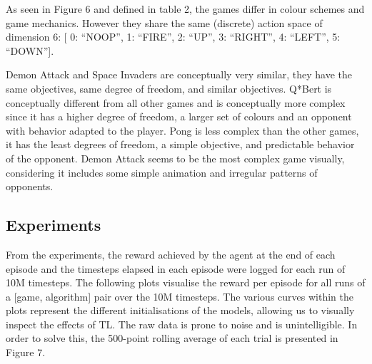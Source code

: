 As seen in Figure 6 and defined in table 2, the games differ in colour schemes and game mechanics. However they share the same (discrete) action space of dimension 6: [ 0: ``NOOP'', 1: ``FIRE'', 2: ``UP'', 3: ``RIGHT'', 4: ``LEFT'', 5: ``DOWN'']. 

Demon Attack and Space Invaders are conceptually very similar, they have the same objectives, same degree of freedom, and similar objectives. 
Q*Bert is conceptually different from all other games and is conceptually more complex since it has a higher degree of freedom, a larger set of colours and an opponent with behavior adapted to the player. Pong is less complex than the other games, it has the least degrees of freedom, a simple objective, and predictable behavior of the opponent. 
Demon Attack seems to be the most complex game visually, considering it includes some simple animation and irregular patterns of opponents.

\subsection*{Experiments}
From the experiments, the reward achieved by the agent at the end of each episode and the timesteps elapsed in each episode were logged for each run of 10M timesteps. The following plots visualise the reward per episode for all runs of a [game, algorithm] pair over the 10M timesteps. The various curves within the plots represent the different initialisations of the models, allowing us to visually inspect the effects of TL. The raw data is prone to noise and is unintelligible. In order to solve this, the 500-point rolling average of each trial is presented in Figure 7.

